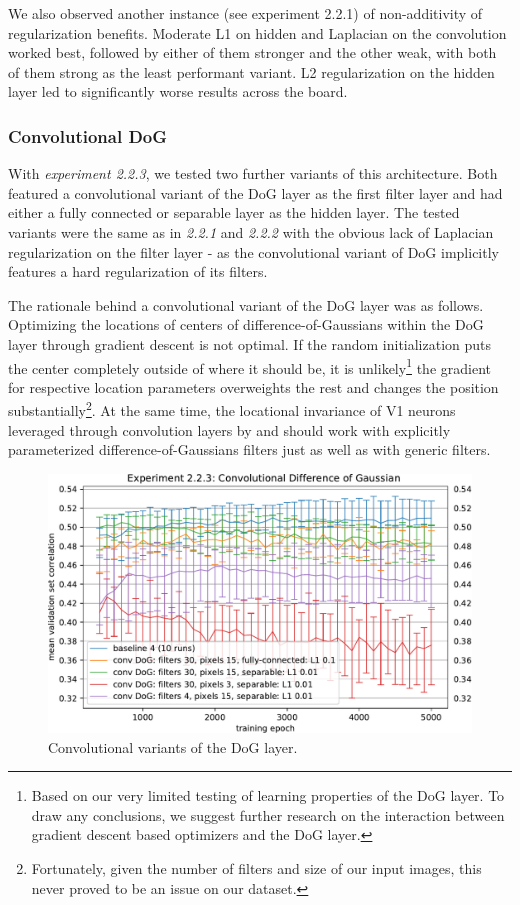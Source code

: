 We also observed another instance (see experiment 2.2.1) of non-additivity of regularization benefits. Moderate L1 on hidden and Laplacian on the convolution worked best, followed by either of them stronger and the other weak, with both of them strong as the least performant variant. L2 regularization on the hidden layer led to significantly worse results across the board.

\subsubsection{Convolutional DoG}

With \textit{experiment 2.2.3}, we tested two further variants of this architecture. Both featured a convolutional variant of the DoG layer as the first filter layer and had either a fully connected or separable layer as the hidden layer. The tested variants were the same as in \textit{2.2.1} and \textit{2.2.2} with the obvious lack of Laplacian regularization on the filter layer - as the convolutional variant of DoG implicitly features a hard regularization of its filters.

The rationale behind a convolutional variant of the DoG layer was as follows. Optimizing the locations of centers of difference-of-Gaussians within the DoG layer through gradient descent is not optimal. If the random initialization puts the center completely outside of where it should be, it is unlikely\footnote{Based on our very limited testing of learning properties of the DoG layer. To draw any conclusions, we suggest further research on the interaction between gradient descent based optimizers and the DoG layer.} the gradient for respective location parameters overweights the rest and changes the position substantially\footnote{Fortunately, given the number of filters and size of our input images, this never proved to be an issue on our dataset.}. At the same time, the locational invariance of V1 neurons leveraged through convolution layers by \citeauthor{klindt} and \citeauthor{ecker} should work with explicitly parameterized difference-of-Gaussians filters just as well as with generic filters.

\begin{figure}[H]
    \centering
    \includegraphics[width=1\textwidth]{../figures/05_2_2_3}
    \caption[Experiment 2.2.3]{Convolutional variants of the DoG layer.}
    \label{fig:5.2.2.3}
\end{figure}

